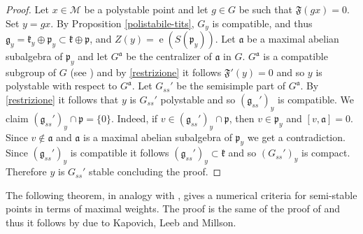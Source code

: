 \documentclass[leqno,11pt, a4]{amsart}
\theoremstyle{named}
\begin{document}
\begin{proof}
Let $x\in {\mathscr{M}}$ be a polystable point and let $g\in G$ be such that ${\mathfrak{F}} (g x)=0$. Set $y=gx$. By Proposition  \ref{polistabile-tits}, $G_{y}$ is compatible, and thus ${\mathfrak{g}}_y={\mathfrak{k}}_y \oplus {\mathfrak{p}}_y\subset {\mathfrak{k}}\oplus {\mathfrak{p}}$, and $Z(y)={\operatorname{e}}(S({\mathfrak{p}}_y))$. Let ${\mathfrak{a}}$ be a maximal abelian subalgebra  of ${\mathfrak{p}}_{y}$ and let $G^{\mathfrak{a}}$ be the centralizer of ${\mathfrak{a}}$ in $G$. $G^{\mathfrak{a}}$ is a compatible subgroup of $G$ (see \cite{knapp-beyond}) and by \eqref{restrizione} it follows ${\mathfrak{F}}' (y)=0$  and so $y$ is polystable with respect to $G^{\mathfrak{a}}$.
Let $G_{ss}'$ be the semisimple part of $G^{\mathfrak{a}}$. By \ref{restrizione} it follows that $y$ is $G_{ss}'$ polystable and so $({\mathfrak{g}}_{ss}')_y$ is compatible. We claim $({\mathfrak{g}}_{ss}')_y \cap {\mathfrak{p}}=\{0\}$. Indeed, if $v\in ({\mathfrak{g}}_{ss}')_y\cap {\mathfrak{p}}$, then $v\in {\mathfrak{p}}_y$  and $[v,{\mathfrak{a}}]=0$. Since $v\notin {\mathfrak{a}}$ and ${\mathfrak{a}}$ is a maximal abelian subalgebra of ${\mathfrak{p}}_y$ we get a contradiction. Since $({\mathfrak{g}}_{ss}')_y$ is compatible it follows $({\mathfrak{g}}_{ss}')_y \subset {\mathfrak{k}}$ and so $(G_{ss}')_y$ is compact. Therefore $y$ is $G_{ss}'$ stable concluding the proof.
\end{proof}
 
 

The following theorem, in analogy with \cite[Th. 4.17]{bgs}, gives a numerical criteria for semi-stable points in terms of maximal weights. The proof is the same of the proof of \cite[Theorem 4.3]{teleman-symplectic-stability} and thus it follows by \cite[Lemma 3.4]{kapovich-leeb-millson-convex-JDG} due to Kapovich, Leeb and Millson.
\end{document}
